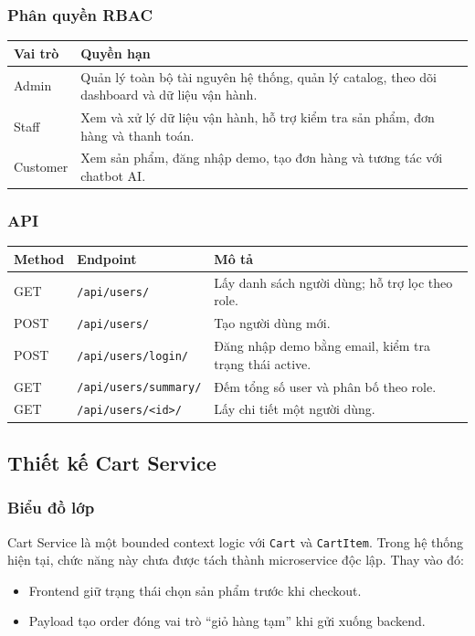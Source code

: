 \documentclass[12pt,a4paper]{article}
\begin{document}
\subsubsection{Phân quyền RBAC}
\begin{longtable}{p{2.8cm}p{10.2cm}}
\toprule
\textbf{Vai trò} & \textbf{Quyền hạn} \\
\midrule
Admin & Quản lý toàn bộ tài nguyên hệ thống, quản lý catalog, theo dõi dashboard và dữ liệu vận hành. \\
Staff & Xem và xử lý dữ liệu vận hành, hỗ trợ kiểm tra sản phẩm, đơn hàng và thanh toán. \\
Customer & Xem sản phẩm, đăng nhập demo, tạo đơn hàng và tương tác với chatbot AI. \\
\bottomrule
\end{longtable}

\subsubsection{API}
\begin{longtable}{p{3.2cm}p{3.4cm}p{6.8cm}}
\toprule
\textbf{Method} & \textbf{Endpoint} & \textbf{Mô tả} \\
\midrule
GET & \texttt{/api/users/} & Lấy danh sách người dùng; hỗ trợ lọc theo role. \\
POST & \texttt{/api/users/} & Tạo người dùng mới. \\
POST & \texttt{/api/users/login/} & Đăng nhập demo bằng email, kiểm tra trạng thái active. \\
GET & \texttt{/api/users/summary/} & Đếm tổng số user và phân bố theo role. \\
GET & \texttt{/api/users/\textless id\textgreater/} & Lấy chi tiết một người dùng. \\
\bottomrule
\end{longtable}

\subsection{Thiết kế Cart Service}
\subsubsection{Biểu đồ lớp}
Cart Service là một bounded context logic với \texttt{Cart} và \texttt{CartItem}. Trong hệ thống hiện tại, chức năng này chưa được tách thành microservice độc lập. Thay vào đó:
\begin{itemize}
  \item Frontend giữ trạng thái chọn sản phẩm trước khi checkout.
  \item Payload tạo order đóng vai trò ``giỏ hàng tạm'' khi gửi xuống backend.
\end{itemize}
\end{document}
